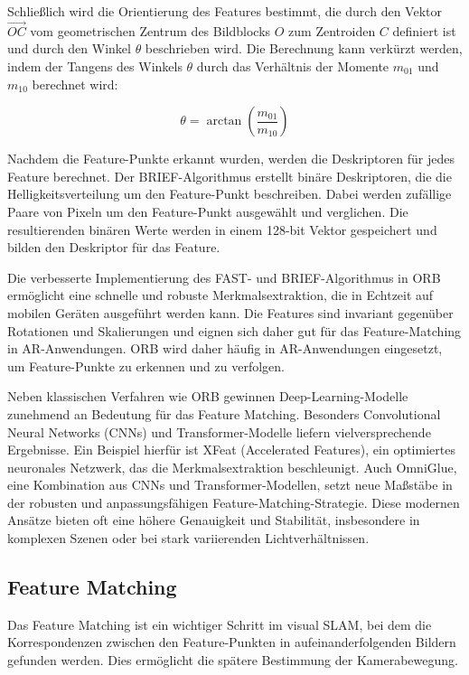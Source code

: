 Schließlich wird die Orientierung des Features bestimmt, die durch den Vektor \( \overrightarrow{OC} \) vom geometrischen Zentrum des Bildblocks \( O \) zum Zentroiden \( C \) definiert ist und durch den Winkel \( \theta \) beschrieben wird. Die Berechnung kann verkürzt werden, indem der Tangens des Winkels \( \theta \) durch das Verhältnis der Momente \( m_{01} \) und \( m_{10} \) berechnet wird:

\begin{equation}
    \theta = \arctan \left( \frac{m_{01}}{m_{10}} \right)
\end{equation}

Nachdem die Feature-Punkte erkannt wurden, werden die Deskriptoren für jedes Feature berechnet. Der BRIEF-Algorithmus erstellt binäre Deskriptoren, die die Helligkeitsverteilung um den Feature-Punkt beschreiben. Dabei werden zufällige Paare von Pixeln um den Feature-Punkt ausgewählt und verglichen. Die resultierenden binären Werte werden in einem 128-bit Vektor gespeichert und bilden den Deskriptor für das Feature.

Die verbesserte Implementierung des FAST- und BRIEF-Algorithmus in ORB ermöglicht eine schnelle und robuste Merkmalsextraktion, die in Echtzeit auf mobilen Geräten ausgeführt werden kann. Die Features sind invariant gegenüber Rotationen und Skalierungen und eignen sich daher gut für das Feature-Matching in AR-Anwendungen. ORB wird daher häufig in AR-Anwendungen eingesetzt, um Feature-Punkte zu erkennen und zu verfolgen.

Neben klassischen Verfahren wie ORB gewinnen Deep-Learning-Modelle zunehmend an Bedeutung für das Feature Matching. Besonders Convolutional Neural Networks (CNNs) und Transformer-Modelle liefern vielversprechende Ergebnisse. Ein Beispiel hierfür ist XFeat (Accelerated Features), ein optimiertes neuronales Netzwerk, das die Merkmalsextraktion beschleunigt. Auch OmniGlue, eine Kombination aus CNNs und Transformer-Modellen, setzt neue Maßstäbe in der robusten und anpassungsfähigen Feature-Matching-Strategie. Diese modernen Ansätze bieten oft eine höhere Genauigkeit und Stabilität, insbesondere in komplexen Szenen oder bei stark variierenden Lichtverhältnissen.

\subsection{Feature Matching}

Das Feature Matching ist ein wichtiger Schritt im visual SLAM, bei dem die Korrespondenzen zwischen den Feature-Punkten in aufeinanderfolgenden Bildern gefunden werden. Dies ermöglicht die spätere Bestimmung der Kamerabewegung. 

